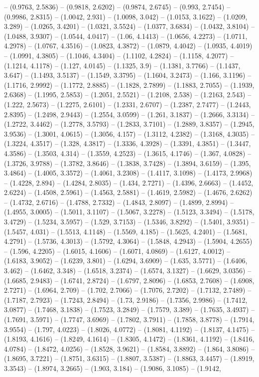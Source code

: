 -- (0.9763, 2.5836) -- (0.9818, 2.6202) -- (0.9874, 2.6745) -- (0.993, 2.7454) -- (0.9986, 2.8315) -- (1.0042, 2.931) -- (1.0098, 3.042) -- (1.0153, 3.1622) -- (1.0209, 3.289) -- (1.0265, 3.4201) -- (1.0321, 3.5524) -- (1.0377, 3.6834) -- (1.0432, 3.8104) -- (1.0488, 3.9307) -- (1.0544, 4.0417) -- (1.06, 4.1413) -- (1.0656, 4.2273) -- (1.0711, 4.2978) -- (1.0767, 4.3516) -- (1.0823, 4.3872) -- (1.0879, 4.4042) -- (1.0935, 4.4019) -- (1.0991, 4.3805) -- (1.1046, 4.3404) -- (1.1102, 4.2824) -- (1.1158, 4.2077) -- (1.1214, 4.1178) -- (1.127, 4.0145) -- (1.1325, 3.9) -- (1.1381, 3.7766) -- (1.1437, 3.647) -- (1.1493, 3.5137) -- (1.1549, 3.3795) -- (1.1604, 3.2473) -- (1.166, 3.1196) -- (1.1716, 2.9992) -- (1.1772, 2.8885) -- (1.1828, 2.7899) -- (1.1883, 2.7055) -- (1.1939, 2.6368) -- (1.1995, 2.5853) -- (1.2051, 2.5521) -- (1.2108, 2.538) -- (1.2163, 2.543) -- (1.222, 2.5673) -- (1.2275, 2.6101) -- (1.2331, 2.6707) -- (1.2387, 2.7477) -- (1.2443, 2.8395) -- (1.2498, 2.9443) -- (1.2554, 3.0599) -- (1.261, 3.1837) -- (1.2666, 3.3134) -- (1.2722, 3.4462) -- (1.2778, 3.5793) -- (1.2833, 3.7101) -- (1.2889, 3.8357) -- (1.2945, 3.9536) -- (1.3001, 4.0615) -- (1.3056, 4.157) -- (1.3112, 4.2382) -- (1.3168, 4.3035) -- (1.3224, 4.3517) -- (1.328, 4.3817) -- (1.3336, 4.3928) -- (1.3391, 4.3851) -- (1.3447, 4.3586) -- (1.3503, 4.314) -- (1.3559, 4.2523) -- (1.3615, 4.1746) -- (1.367, 4.0828) -- (1.3726, 3.9788) -- (1.3782, 3.8646) -- (1.3838, 3.7428) -- (1.3894, 3.6159) -- (1.395, 3.4864) -- (1.4005, 3.3572) -- (1.4061, 3.2308) -- (1.4117, 3.1098) -- (1.4173, 2.9968) -- (1.4228, 2.894) -- (1.4284, 2.8035) -- (1.434, 2.7271) -- (1.4396, 2.6663) -- (1.4452, 2.6224) -- (1.4508, 2.5961) -- (1.4563, 2.5881) -- (1.4619, 2.5982) -- (1.4676, 2.6262) -- (1.4732, 2.6716) -- (1.4788, 2.7332) -- (1.4843, 2.8097) -- (1.4899, 2.8994) -- (1.4955, 3.0005) -- (1.5011, 3.1107) -- (1.5067, 3.2278) -- (1.5123, 3.3494) -- (1.5178, 3.4729) -- (1.5234, 3.5957) -- (1.529, 3.7153) -- (1.5346, 3.8292) -- (1.5401, 3.9351) -- (1.5457, 4.031) -- (1.5513, 4.1148) -- (1.5569, 4.185) -- (1.5625, 4.2401) -- (1.5681, 4.2791) -- (1.5736, 4.3013) -- (1.5792, 4.3064) -- (1.5848, 4.2943) -- (1.5904, 4.2655) -- (1.596, 4.2205) -- (1.6015, 4.1606) -- (1.6071, 4.0869) -- (1.6127, 4.0012) -- (1.6183, 3.9052) -- (1.6239, 3.801) -- (1.6294, 3.6909) -- (1.635, 3.5771) -- (1.6406, 3.462) -- (1.6462, 3.348) -- (1.6518, 3.2374) -- (1.6574, 3.1327) -- (1.6629, 3.0356) -- (1.6685, 2.9483) -- (1.6741, 2.8724) -- (1.6797, 2.8096) -- (1.6853, 2.7608) -- (1.6908, 2.7271) -- (1.6964, 2.709) -- (1.702, 2.7066) -- (1.7076, 2.7202) -- (1.7132, 2.7489) -- (1.7187, 2.7923) -- (1.7243, 2.8494) -- (1.73, 2.9186) -- (1.7356, 2.9986) -- (1.7412, 3.0877) -- (1.7468, 3.1838) -- (1.7523, 3.2849) -- (1.7579, 3.389) -- (1.7635, 3.4937) -- (1.7691, 3.5971) -- (1.7747, 3.6969) -- (1.7802, 3.7911) -- (1.7858, 3.8778) -- (1.7914, 3.9554) -- (1.797, 4.0223) -- (1.8026, 4.0772) -- (1.8081, 4.1192) -- (1.8137, 4.1475) -- (1.8193, 4.1616) -- (1.8249, 4.1614) -- (1.8305, 4.1472) -- (1.8361, 4.1192) -- (1.8416, 4.0784) -- (1.8472, 4.0256) -- (1.8528, 3.9621) -- (1.8584, 3.8892) -- (1.864, 3.8086) -- (1.8695, 3.7221) -- (1.8751, 3.6315) -- (1.8807, 3.5387) -- (1.8863, 3.4457) -- (1.8919, 3.3543) -- (1.8974, 3.2665) -- (1.903, 3.184) -- (1.9086, 3.1085) -- (1.9142, 